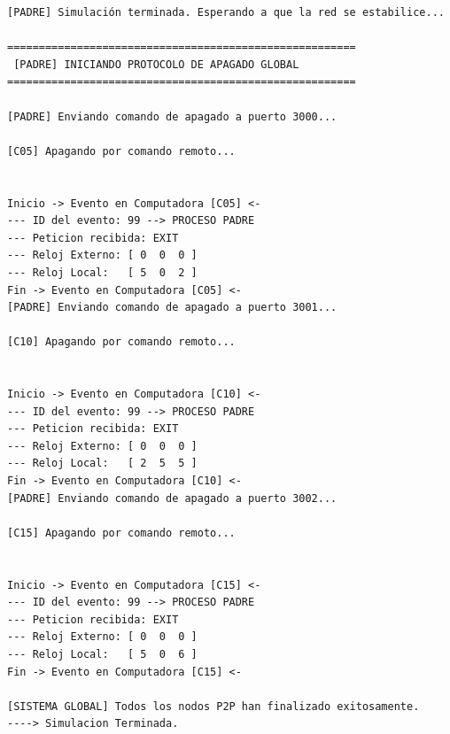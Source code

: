 \begin{lstlisting}[style=estiloC]
[PADRE] Simulación terminada. Esperando a que la red se estabilice...

=======================================================
 [PADRE] INICIANDO PROTOCOLO DE APAGADO GLOBAL 
=======================================================

[PADRE] Enviando comando de apagado a puerto 3000...

[C05] Apagando por comando remoto...


Inicio -> Evento en Computadora [C05] <-
--- ID del evento: 99 --> PROCESO PADRE
--- Peticion recibida: EXIT
--- Reloj Externo: [ 0  0  0 ]
--- Reloj Local:   [ 5  0  2 ]
Fin -> Evento en Computadora [C05] <-
[PADRE] Enviando comando de apagado a puerto 3001...

[C10] Apagando por comando remoto...


Inicio -> Evento en Computadora [C10] <-
--- ID del evento: 99 --> PROCESO PADRE
--- Peticion recibida: EXIT
--- Reloj Externo: [ 0  0  0 ]
--- Reloj Local:   [ 2  5  5 ]
Fin -> Evento en Computadora [C10] <-
[PADRE] Enviando comando de apagado a puerto 3002...

[C15] Apagando por comando remoto...


Inicio -> Evento en Computadora [C15] <-
--- ID del evento: 99 --> PROCESO PADRE
--- Peticion recibida: EXIT
--- Reloj Externo: [ 0  0  0 ]
--- Reloj Local:   [ 5  0  6 ]
Fin -> Evento en Computadora [C15] <-

[SISTEMA GLOBAL] Todos los nodos P2P han finalizado exitosamente.
----> Simulacion Terminada.
\end{lstlisting}